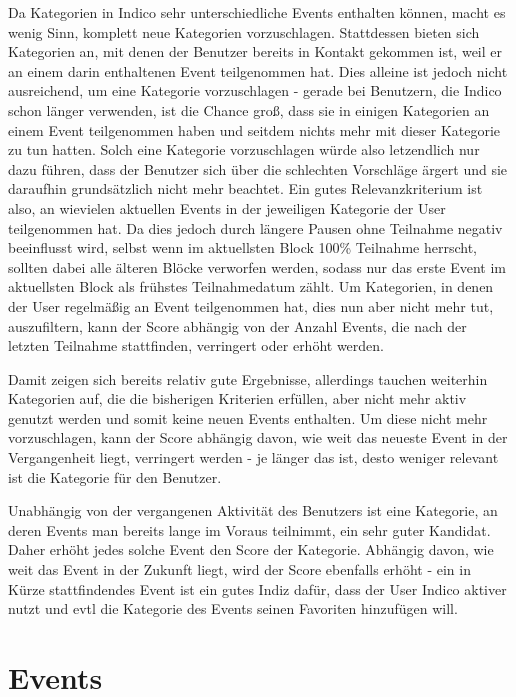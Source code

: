 Da Kategorien in Indico sehr unterschiedliche Events enthalten können, macht es wenig Sinn, komplett
neue Kategorien vorzuschlagen. Stattdessen bieten sich Kategorien an, mit denen der Benutzer bereits
in Kontakt gekommen ist, weil er an einem darin enthaltenen Event teilgenommen hat. Dies alleine ist
jedoch nicht ausreichend, um eine Kategorie vorzuschlagen - gerade bei Benutzern, die Indico schon
länger verwenden, ist die Chance groß, dass sie in einigen Kategorien an einem Event teilgenommen
haben und seitdem nichts mehr mit dieser Kategorie zu tun hatten. Solch eine Kategorie vorzuschlagen
würde also letzendlich nur dazu führen, dass der Benutzer sich über die schlechten Vorschläge ärgert
und sie daraufhin grundsätzlich nicht mehr beachtet. Ein gutes Relevanzkriterium ist also, an
wievielen aktuellen Events in der jeweiligen Kategorie der User teilgenommen hat. Da dies jedoch
durch längere Pausen ohne Teilnahme negativ beeinflusst wird, selbst wenn im aktuellsten Block 100\%
Teilnahme herrscht, sollten dabei alle älteren Blöcke verworfen werden, sodass nur das erste Event
im aktuellsten Block als frühstes Teilnahmedatum zählt. Um Kategorien, in denen der User regelmäßig
an Event teilgenommen hat, dies nun aber nicht mehr tut, auszufiltern, kann der Score abhängig von
der Anzahl Events, die nach der letzten Teilnahme stattfinden, verringert oder erhöht werden.

Damit zeigen sich bereits relativ gute Ergebnisse, allerdings tauchen weiterhin Kategorien auf, die
die bisherigen Kriterien erfüllen, aber nicht mehr aktiv genutzt werden und somit keine neuen Events
enthalten. Um diese nicht mehr vorzuschlagen, kann der Score abhängig davon, wie weit das neueste
Event in der Vergangenheit liegt, verringert werden - je länger das ist, desto weniger relevant ist
die Kategorie für den Benutzer.

Unabhängig von der vergangenen Aktivität des Benutzers ist eine Kategorie, an deren Events man
bereits lange im Voraus teilnimmt, ein sehr guter Kandidat. Daher erhöht jedes solche Event den
Score der Kategorie. Abhängig davon, wie weit das Event in der Zukunft liegt, wird der Score
ebenfalls erhöht - ein in Kürze stattfindendes Event ist ein gutes Indiz dafür, dass der User Indico
aktiver nutzt und evtl die Kategorie des Events seinen Favoriten hinzufügen will.


\section{Events}

